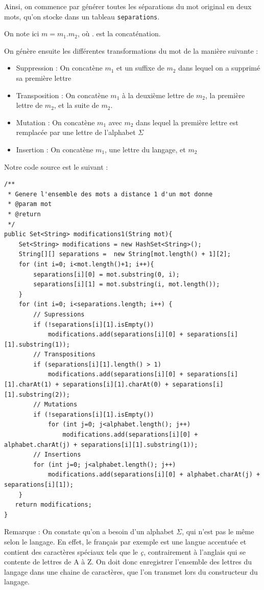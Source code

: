 \documentclass[10pt,a4paper]{article}
\begin{document}
Ainsi, on commence par générer toutes les séparations du mot original en deux mots, qu'on stocke dans un tableau \verb!separations!.

On note ici $m = m_1.m_2$, où $.$ est la concaténation.

On génère ensuite les différentes transformations du mot de la manière suivante :\\ 

\begin{itemize}
\item Suppression : On concatène $m_1$ et un suffixe de $m_2$ dans lequel on a supprimé sa première lettre
\item Transposition : On concatène $m_1$ à la deuxième lettre de $m_2$, la première lettre de $m_2$, et la suite de $m_2$.
\item Mutation : On concatène $m_1$ avec $m_2$ dans lequel la première lettre est remplacée par une lettre de l'alphabet $\Sigma$
\item Insertion : On concatène $m_1$, une lettre du langage, et $m_2$\\
\end{itemize}

Notre code source est le suivant : 

\begin{lstlisting}
/**
 * Genere l'ensemble des mots a distance 1 d'un mot donne
 * @param mot
 * @return
 */
public Set<String> modifications1(String mot){        
	Set<String> modifications = new HashSet<String>();    
	String[][] separations =  new String[mot.length() + 1][2];
	for (int i=0; i<mot.length()+1; i++){
		separations[i][0] = mot.substring(0, i);
		separations[i][1] = mot.substring(i, mot.length());
	}
	for (int i=0; i<separations.length; i++) {
		// Supressions
		if (!separations[i][1].isEmpty())
			modifications.add(separations[i][0] + separations[i][1].substring(1));
		// Transpositions
		if (separations[i][1].length() > 1)
			modifications.add(separations[i][0] + separations[i][1].charAt(1) + separations[i][1].charAt(0) + separations[i][1].substring(2));
		// Mutations
		if (!separations[i][1].isEmpty())
			for (int j=0; j<alphabet.length(); j++)
				modifications.add(separations[i][0] + alphabet.charAt(j) + separations[i][1].substring(1));
		// Insertions
		for (int j=0; j<alphabet.length(); j++)
			modifications.add(separations[i][0] + alphabet.charAt(j) + separations[i][1]);            
	}
   return modifications;
}
\end{lstlisting}

Remarque : On constate qu'on a besoin d'un alphabet $\Sigma$, qui n'est pas le même selon le langage. En effet, le français par exemple est une langue accentuée et contient des caractères spéciaux tels que le \textit{ç}, contrairement à l'anglais qui se contente de lettres de A à Z. On doit donc enregistrer l'ensemble des lettres du langage dans une chaine de caractères, que l'on transmet lors du constructeur du langage.
\end{document}
